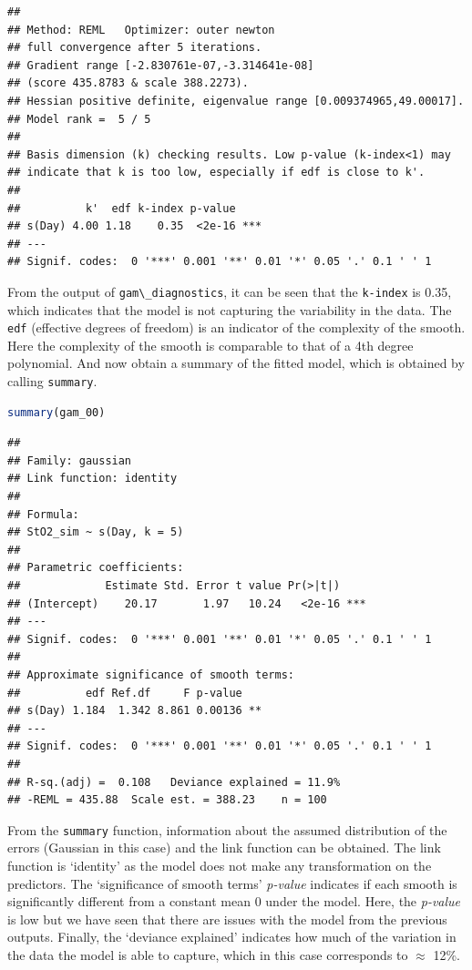 \documentclass[
]{article}
\newcommand{\passthrough}[1]{#1}
\begin{document}
\begin{lstlisting}
## 
## Method: REML   Optimizer: outer newton
## full convergence after 5 iterations.
## Gradient range [-2.830761e-07,-3.314641e-08]
## (score 435.8783 & scale 388.2273).
## Hessian positive definite, eigenvalue range [0.009374965,49.00017].
## Model rank =  5 / 5 
## 
## Basis dimension (k) checking results. Low p-value (k-index<1) may
## indicate that k is too low, especially if edf is close to k'.
## 
##          k'  edf k-index p-value    
## s(Day) 4.00 1.18    0.35  <2e-16 ***
## ---
## Signif. codes:  0 '***' 0.001 '**' 0.01 '*' 0.05 '.' 0.1 ' ' 1
\end{lstlisting}

From the output of \passthrough{\lstinline!gam\_diagnostics!}, it can be seen that the \passthrough{\lstinline!k-index!} is 0.35, which indicates that the model is not capturing the variability in the data. The \passthrough{\lstinline!edf!} (effective degrees of freedom) is an indicator of the complexity of the smooth. Here the complexity of the smooth is comparable to that of a 4th degree polynomial. And now obtain a summary of the fitted model, which is obtained by calling \passthrough{\lstinline!summary!}.

\begin{lstlisting}[language=R]
summary(gam_00)
\end{lstlisting}

\begin{lstlisting}
## 
## Family: gaussian 
## Link function: identity 
## 
## Formula:
## StO2_sim ~ s(Day, k = 5)
## 
## Parametric coefficients:
##             Estimate Std. Error t value Pr(>|t|)    
## (Intercept)    20.17       1.97   10.24   <2e-16 ***
## ---
## Signif. codes:  0 '***' 0.001 '**' 0.01 '*' 0.05 '.' 0.1 ' ' 1
## 
## Approximate significance of smooth terms:
##          edf Ref.df     F p-value   
## s(Day) 1.184  1.342 8.861 0.00136 **
## ---
## Signif. codes:  0 '***' 0.001 '**' 0.01 '*' 0.05 '.' 0.1 ' ' 1
## 
## R-sq.(adj) =  0.108   Deviance explained = 11.9%
## -REML = 435.88  Scale est. = 388.23    n = 100
\end{lstlisting}

From the \passthrough{\lstinline!summary!} function, information about the assumed distribution of the errors (Gaussian in this case) and the link function can be obtained. The link function is `identity' as the model does not make any transformation on the predictors. The `significance of smooth terms' \emph{p-value} indicates if each smooth is significantly different from a constant mean 0 under the model. Here, the \emph{p-value} is low but we have seen that there are issues with the model from the previous outputs. Finally, the `deviance explained' indicates how much of the variation in the data the model is able to capture, which in this case corresponds to \(\approx\) 12\%.
\end{document}
